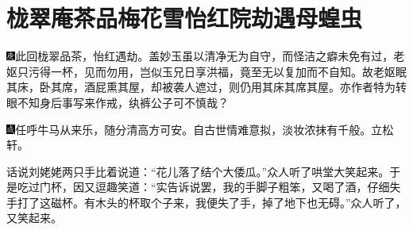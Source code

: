 

\chapter{栊翠庵茶品梅花雪\hspace{.5em}怡红院劫遇母蝗虫}

{\includegraphics[width=3mm]{../Images/00004}此回栊翠品茶，怡红遇劫。盖妙玉虽以清净无为自守，而怪洁之癖未免有过，老妪只污得一杯，见而勿用，岂似玉兄日享洪福，竟至无以复加而不自知。故老妪眠其床，卧其席，酒屁熏其屋，却被袭人遮过，则仍用其床其席其屋。亦作者特为转眼不知身后事写来作戒，纨裤公子可不慎哉？}

{\includegraphics[width=3mm]{../Images/00005}任呼牛马从来乐，随分清高方可安。自古世情难意拟，淡妆浓抹有千般。立松轩。}

话说刘姥姥两只手比着说道：``花儿落了结个大倭瓜。''众人听了哄堂大笑起来。于是吃过门杯，因又逗趣笑道：``实告诉说罢，我的手脚子粗笨，又喝了酒，仔细失手打了这磁杯。有木头的杯取个子来，我便失了手，掉了地下也无碍。''众人听了，又笑起来。

